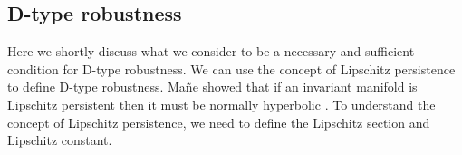 \documentclass{article} %
\newcounter{ct}
\theoremstyle{definition}
\theoremstyle{remark}
\begin{document}


\subsection{D-type robustness}\label{sec:persitencempliesnh}
Here we shortly discuss what we consider to be a necessary and sufficient condition for D-type robustness.
We can use the concept of Lipschitz persistence to define D-type robustness.
Ma\~{n}e showed that if an invariant manifold is Lipschitz persistent then it must be normally hyperbolic \citep{mane1978persistent}. 
To understand the concept of Lipschitz persistence, we need to define the Lipschitz section and Lipschitz constant.
\end{document}
